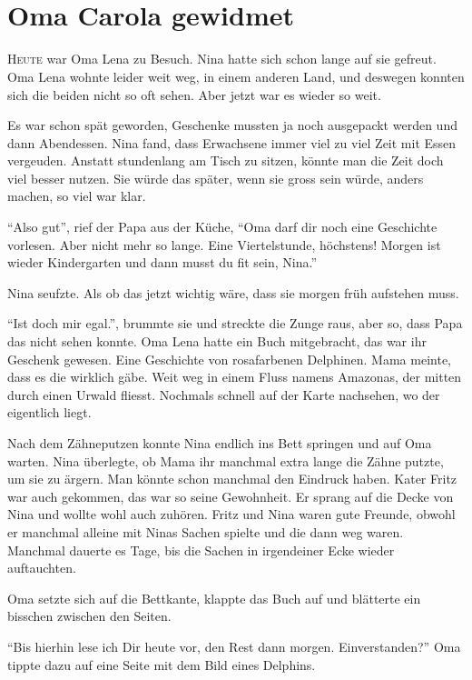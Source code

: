 \chapter*{\\\small \color{DeepPink} Oma Carola gewidmet}
\lettrine[lines=3]{\color{DeepPink}H}{eute} war Oma Lena zu Besuch. Nina hatte sich schon lange auf sie gefreut. Oma Lena wohnte leider weit weg, in einem anderen Land, und deswegen konnten sich die beiden nicht so oft sehen. Aber jetzt war es wieder so weit. 

Es war schon spät geworden, Geschenke mussten ja noch ausgepackt werden und dann Abendessen. Nina fand, dass Erwachsene immer viel zu viel Zeit mit Essen vergeuden. Anstatt stundenlang am Tisch zu sitzen, könnte man die Zeit doch viel besser nutzen. Sie würde das später, wenn sie gross sein würde, anders machen, so viel war klar.

\enquote{Also gut}, rief der Papa aus der Küche, \enquote{Oma darf dir noch eine Geschichte vorlesen. Aber nicht mehr so lange. Eine Viertelstunde, höchstens! Morgen ist wieder Kindergarten und dann musst du fit sein, Nina.}

Nina seufzte. Als ob das jetzt wichtig wäre, dass sie morgen früh aufstehen muss. 

\enquote{Ist doch mir egal.}, brummte sie und streckte die Zunge raus, aber so, dass Papa das nicht sehen konnte. Oma Lena hatte ein Buch mitgebracht, das war ihr Geschenk gewesen. Eine Geschichte von rosafarbenen Delphinen. Mama meinte, dass es die wirklich gäbe. Weit weg in einem Fluss namens Amazonas, der mitten durch einen Urwald fliesst. Nochmals schnell auf der Karte nachsehen, wo der eigentlich liegt.

Nach dem Zähneputzen konnte Nina endlich ins Bett springen und auf Oma warten. Nina überlegte, ob Mama ihr manchmal extra lange die Zähne putzte, um sie zu ärgern. Man könnte schon manchmal den Eindruck haben. Kater Fritz war auch gekommen, das war so seine Gewohnheit. Er sprang auf die Decke von Nina und wollte wohl auch zuhören. Fritz und Nina waren gute Freunde, obwohl er manchmal alleine mit Ninas Sachen spielte und die dann weg waren. Manchmal dauerte es Tage, bis die Sachen in irgendeiner Ecke wieder auftauchten. 

Oma setzte sich auf die Bettkante, klappte das Buch auf und blätterte ein bisschen zwischen den Seiten.

\enquote{Bis hierhin lese ich Dir heute vor, den Rest dann morgen. Einverstanden?} Oma tippte dazu auf eine Seite mit dem Bild eines Delphins. 

